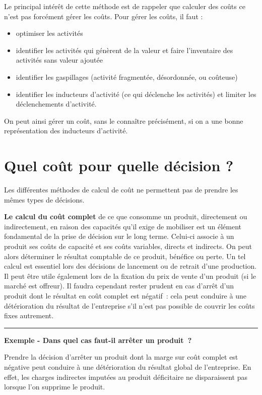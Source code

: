 \documentclass[oneside]{kaobook}
\begin{document}
Le principal intérêt de cette méthode est de rappeler que calculer des coûts ce n’est pas forcément gérer les coûts. Pour gérer les coûts, il faut :
\begin{itemize}
\item optimiser les activités
\item identifier les activités qui génèrent de la valeur et faire l’inventaire des activités sans valeur ajoutée
\item identifier les gaspillages (activité fragmentée, désordonnée, ou coûteuse)
\item identifier les inducteurs d’activité (ce qui déclenche les activités) et limiter les déclenchements d’activité.
\end{itemize}

On peut ainsi gérer un coût, sans le connaître précisément, si on a une bonne représentation des inducteurs d'activité.

\section{Quel coût pour quelle décision ?}
\label{sec:org761c370}
Les différentes méthodes de calcul de coût ne permettent pas de prendre les mêmes types de décisions.

\textbf{Le calcul du coût complet} de ce que consomme un produit, directement ou indirectement, en raison des capacités qu'il exige de mobiliser est un élément fondamental de la prise de décision sur le long terme. Celui-ci associe à un produit ses coûts de capacité et ses coûts variables, directs et indirects. On peut alors déterminer le résultat comptable de ce produit, bénéfice ou perte. Un tel calcul est essentiel lors des décisions de lancement ou de retrait d'une production. Il peut être utile également lors de la fixation du prix de vente d'un produit (si le marché est offreur). Il faudra cependant rester prudent en cas d'arrêt d'un produit dont le résultat en coût complet est négatif : cela peut conduire à une détérioration du résultat de l'entreprise s'il n'est pas possible de couvrir les coûts fixes autrement.

\noindent\rule{\textwidth}{0.5pt}
\textbf{Exemple - Dans quel cas faut-il arrêter un produit ?}

Prendre la décision d'arrêter un produit dont la marge sur coût complet est négative peut conduire à une détérioration du résultat global de l'entreprise. En effet, les charges indirectes imputées au produit déficitaire ne disparaissent pas lorsque l'on supprime le produit.
\end{document}
